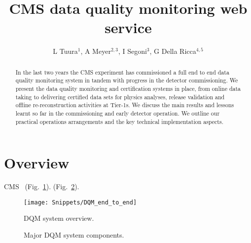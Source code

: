 \documentclass[a4paper]{jpconf}
\begin{document}
\title{CMS data quality monitoring web service}
\author{L Tuura$^1$, A Meyer$^{2,3}$, I Segoni$^3$, G Della Ricca$^{4,5}$}
\address{$^1$ Northeastern University, Boston, MA, USA}
\address{$^2$ DESY, Hamburg, Germany}
\address{$^3$ CERN, Geneva, Switzerland}
\address{$^4$ INFN Sezione di Trieste, Trieste, Italy}
\address{$^5$ Universit\'a di Trieste, Trieste, Italy}

\begin{abstract}
In the last two years the CMS experiment has commissioned a full end
to end data quality monitoring system in tandem with progress in the
detector commissioning.  We present the data quality monitoring and
certification systems in place, from online data taking to delivering
certified data sets for physics analyses, release validation and
offline re-reconstruction activities at Tier-1s.  We discuss the main
results and lessons learnt so far in the commissioning and early
detector operation.  We outline our practical operations arrangements
and the key technical implementation aspects.
\end{abstract}


\section{Overview}
CMS~\cite{cms_tp}  (Fig.~\ref{fig:overview}).  (Fig.~\ref{fig:systems}).

\begin{figure}[!tbp]
\begin{center}
\texttt{[image: Snippets/DQM\_end\_to\_end]}
\end{center}
\caption{\label{fig:overview}DQM system overview.}
\end{figure}

\begin{figure}[!tbp]
\begin{center}
\hfill
{}\hfill
\end{center}
\caption{\label{fig:systems}Major DQM system components.}
\end{figure}

\end{document}
